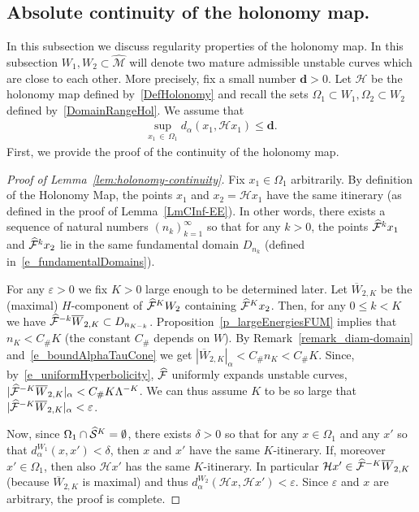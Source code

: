 \documentclass[10pt]{amsart}
\theoremstyle{definition}\newtheorem{defi}[theo]{Definition}\newtheorem{rema}[theo]{Remark}\newtheorem{exam}[theo]{Example}\newtheorem{exem}[theo]{Example}\newtheorem{nota}[theo]{Notation}
\newcommand{\eps}{\varepsilon}
\newcommand{\const}{C_\#}
\newcommand{\bd}{\mathbf{d}}
\newcommand{\cm}{\mathcal{F}}
\newcommand{\hol}{\mathcal{H}}
\newcommand{\csp}{\mathcal{M}}
\newcommand{\cmp}{\hat\cm}
\newcommand{\cspi}{\widehat{\csp}}
\newcommand{\brW}{\overline{W}}
\newcommand{\singPrivate}{\mathcal{S}}
\newcommand{\singp}[1]{\hat{\singPrivate}^{#1}}
\newcommand{\admiss}{admissible}
\newcommand{\adm}{_{\alpha^{+}}}
\newcommand{\Dom}{D}
\renewcommand{\adm}{_{\alpha}}
\let\oldhat\hat
\renewcommand*{\hat}[1]{\mathchoice{\widehat{#1}}{\widehat{#1}}{\oldhat{#1}}{\oldhat{#1}}}
\begin{document}
\subsection{Absolute continuity of the holonomy map.}\label{sec:absol-cont-holon}
In this subsection we discuss regularity properties of the holonomy map. In this subsection $W_1, W_2\subset \cspi$ will denote two mature \admiss{} unstable curves which are close to each other. More precisely, fix a small number $\bd > 0$. Let $\hol$ be the holonomy map defined by~\eqref{DefHolonomy} and recall the sets $\Omega_1\subset W_{1}, \Omega_2\subset W_{2}$ defined by~\eqref{DomainRangeHol}. We assume that
\begin{align}\label{eq:W12-closeness}
\sup_{x_{1}\,\in\,\Omega_1} d_\alpha(x_{1}, \hol x_{1})\leq \bd.
\end{align}
First, we provide the proof of the continuity of the holonomy map.

\begin{proof}[Proof of Lemma~\ref{lem:holonomy-continuity}]
Fix $x_{1}\in\Omega_{1}$ arbitrarily. By definition of the Holonomy Map, the points $x_{1}$ and $x_{2} = \hol x_{1}$ have the same itinerary (as defined in the proof of Lemma~\ref{LmCInf-EE}). In other words, there exists a sequence of natural numbers $(n_{k})_{k = 1}^{\infty}$ so that for any $k > 0$, the points $\cmp^{k}x_{1}$ and $\cmp^{k}x_{2}$ lie in the same fundamental domain $\Dom_{n_{k}}$ (defined in~\eqref{e_fundamentalDomains}).

For any $\eps > 0$ we fix $K > 0$ large enough to be determined later. Let $\brW_{2,K}$ be the (maximal) $H$-component of $\cmp^{K}W_{2}$ containing $\cmp^{K}x_{2}$. Then, for any $0\le k< K$ we have $\cmp^{-k}\brW_{2,K} \subset  \Dom_{n_{K-k}}$. Proposition~\ref{p_largeEnergiesFUM} implies that $n_{K} < \const K$ (the constant $\const$ depends on $W$). By Remark~\ref{remark_diam-domain} and~\eqref{e_boundAlphaTauCone} we get $|\brW_{2,K}|\adm  <   \const n_{K} <   \const K$. Since, by~\eqref{e_uniformHyperbolicity}, $\cmp$ uniformly expands unstable curves, $|\cmp^{-K}\brW_{2,K}|\adm < \const K\Lambda^{-K}$. We can thus assume $K$ to be so large that $|\cmp^{-K}\brW_{2,K}|\adm < \eps$.

Now, since $\Omega_{1}\cap\singp{K} = \emptyset$, there exists $\delta > 0$ so that {for any $x\in \Omega_1$} and any $x'$ so that $d\adm^{W_{1}}(x,x') < \delta$, then $x$ and $x'$ have the same $K$-itinerary. If, moreover $x'\in\Omega_{1}$, then also $\hol x'$ has the same $K$-itinerary. In particular $\hol x'\in\cmp^{-K}\brW_{2,K}$ (because $\brW_{2,K}$ is maximal) and thus $d\adm^{W_{2}}(\hol x,\hol x') < \eps$. Since $\eps$ and $x$ are arbitrary, the proof is complete.
\end{proof}
\end{document}
